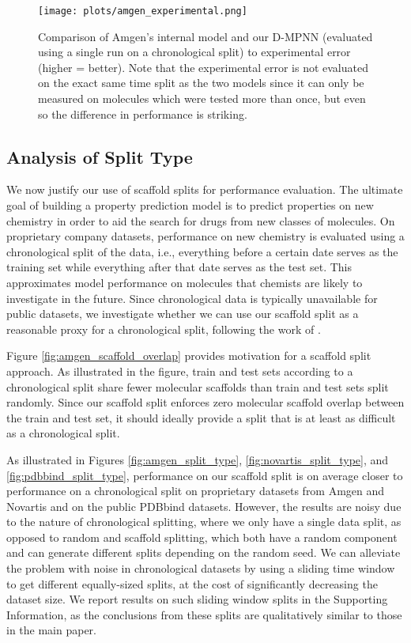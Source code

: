 \documentclass[journal=jcisd8,manuscript=article]{achemso}
\begin{document}
\FloatBarrier

\begin{figure}
  \centering
  \texttt{[image: plots/amgen\_experimental.png]}
  \caption{Comparison of Amgen's internal model and our D-MPNN (evaluated using a single run on a chronological split) to experimental error (higher = better). Note that the experimental error is not evaluated on the exact same time split as the two models since it can only be measured on molecules which were tested more than once, but even so the difference in performance is striking.}
  \label{fig:amgen_experimental}
\end{figure}

\subsection{Analysis of Split Type}

We now justify our use of scaffold splits for performance evaluation. The ultimate goal of building a property prediction model is to predict properties on new chemistry in order to aid the search for drugs from new classes of molecules. On proprietary company datasets, performance on new chemistry is evaluated using a chronological split of the data, i.e., everything before a certain date serves as the training set while everything after that date serves as the test set. This approximates model performance on molecules that chemists are likely to investigate in the future. Since chronological data is typically unavailable for public datasets, we investigate whether we can use our scaffold split as a reasonable proxy for a chronological split, following the work of \citeauthor{sheridan2015relative}\cite{sheridan2015relative}. 

Figure \ref{fig:amgen_scaffold_overlap} provides motivation for a scaffold split approach. As illustrated in the figure, train and test sets according to a chronological split share fewer molecular scaffolds than train and test sets split randomly. Since our scaffold split enforces zero molecular scaffold overlap between the train and test set, it should ideally provide a split that is at least as difficult as a chronological split.

As illustrated in Figures \ref{fig:amgen_split_type}, \ref{fig:novartis_split_type}, and \ref{fig:pdbbind_split_type}, performance on our scaffold split is on average closer to performance on a chronological split on proprietary datasets from Amgen and Novartis and on the public PDBbind datasets. However, the results are noisy due to the nature of chronological splitting, where we only have a single data split, as opposed to random and scaffold splitting, which both have a random component and can generate different splits depending on the random seed. We can alleviate the problem with noise in chronological datasets by using a sliding time window to get different equally-sized splits, at the cost of significantly decreasing the dataset size. We report results on such sliding window splits in the Supporting Information, as the conclusions from these splits are qualitatively similar to those in the main paper.
\end{document}
